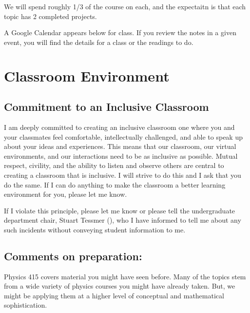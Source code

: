 \documentclass[letterpaper,10pt,english]{jupyterBook}
\begin{document}
\sphinxAtStartPar
We will spend roughly 1/3 of the course on each, and the expectaitn is that each topic has 2 completed projects.

\sphinxAtStartPar
A Google Calendar appears below for class. If you review the notes in a given event, you will find the details for a class or the readings to do.



\sphinxstepscope


\section{Classroom Environment}
\label{\detokenize{content/0_course/environment:classroom-environment}}\label{\detokenize{content/0_course/environment::doc}}

\subsection{Commitment to an Inclusive Classroom}
\label{\detokenize{content/0_course/environment:commitment-to-an-inclusive-classroom}}
\sphinxAtStartPar
I am deeply committed to creating an inclusive classroom \sphinxhyphen{} one where you and your classmates
feel comfortable, intellectually challenged, and able to speak up about your ideas
and experiences. This means that our classroom, our virtual environments, and our interactions
need to be as inclusive as possible. Mutual respect, civility, and the ability to listen
and observe others are central to creating a classroom that is inclusive. I will strive to
do this and I ask that you do the same. If I can do anything to make the classroom a better
learning environment for you, please let me know.

\sphinxAtStartPar
{}

\sphinxAtStartPar
If I violate this principle, please let me know or please tell the undergraduate department chair, Stuart Tessmer (), who I have informed to tell me about any such incidents without conveying student information to me.


\subsection{Comments on preparation:}
\label{\detokenize{content/0_course/environment:comments-on-preparation}}
\sphinxAtStartPar
Physics 415 covers material you might have seen before. Many of the topics
stem from a wide variety of physics courses you might have already taken. But, we might be applying them at a higher level of conceptual and mathematical sophistication.
\end{document}
